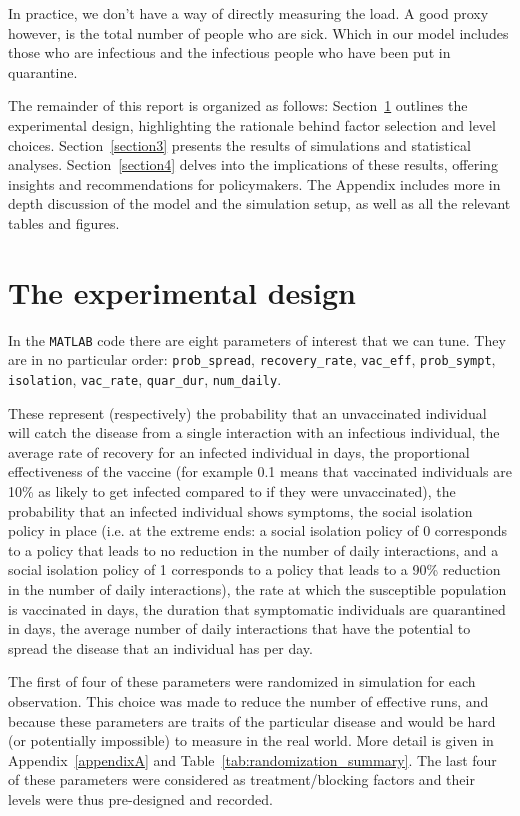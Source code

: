 \documentclass[12pt,a4paper]{article}
\begin{document}
In practice, we don't have a way of directly measuring the load. A good proxy however, is the total number of people who are sick. Which in our model includes those who are infectious and the infectious people who have been put in quarantine.

The remainder of this report is organized as follows: Section~\ref{section2} outlines the experimental design, highlighting the rationale behind factor selection and level choices. Section~\ref{section3} presents the results of simulations and statistical analyses. Section~\ref{section4} delves into the implications of these results, offering insights and  recommendations for policymakers. The Appendix includes more in depth discussion of the model and the simulation setup, as well as all the relevant tables and figures.

\section{The experimental design}\label{section2}

In the \verb`MATLAB` code there are eight parameters of interest that we can tune. They are in no particular order:  \verb`prob_spread`, \verb`recovery_rate`, \verb`vac_eff`, \verb`prob_sympt`,  \verb`isolation`,  \verb`vac_rate`, \verb`quar_dur`, \verb`num_daily`.

These represent (respectively) the probability that an unvaccinated individual will catch the disease from a single interaction with an infectious individual, the average rate of recovery for an infected individual in days, the proportional effectiveness of the vaccine (for example 0.1 means that vaccinated individuals are 10\% as likely to get infected compared to if they were unvaccinated), the probability that an infected individual shows symptoms, the social isolation policy in place (i.e. at the extreme ends: a social isolation policy of 0 corresponds to a policy that leads to no reduction in the number of daily interactions, and a social isolation policy of 1 corresponds to a policy that leads to a 90\% reduction in the number of daily interactions), the rate at which the susceptible population is vaccinated in days, the duration that symptomatic individuals are quarantined in days, the average number of daily interactions that have the potential to spread the disease that an individual has per day. 

The first of four of these parameters were randomized in simulation for each observation. This choice was made to reduce the number of effective runs, and because these parameters are traits of the particular disease and would be hard (or potentially impossible) to measure in the real world. More detail is given in Appendix~\ref{appendixA} and Table~\ref{tab:randomization_summary}. The last four of these parameters were considered as treatment/blocking factors and their levels were thus pre-designed and recorded. 
\end{document}
